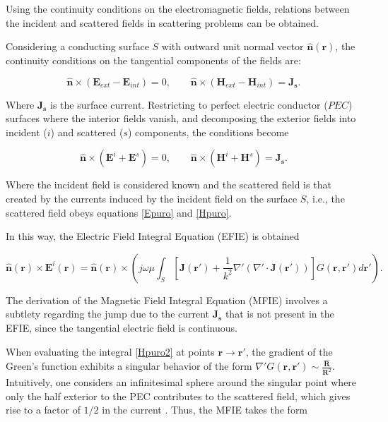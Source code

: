 \documentclass[11pt,a4paper,twoside,pdf]{article}
\numberwithin{equation}{section}
\begin{document}
Using the continuity conditions on the electromagnetic fields, relations between the incident and scattered fields in scattering problems can be obtained.

Considering a conducting surface $S$ with outward unit normal vector $\mathbf{\hat{n}}(\mathbf{r})$, the continuity conditions on the tangential components of the fields are:

\begin{equation}
    \mathbf{\hat{n}} \times (\mathbf{E}_{ext} - \mathbf{E}_{int}) = 0, \qquad \mathbf{\hat{n}} \times (\mathbf{H}_{ext} - \mathbf{H}_{int}) = \mathbf{J_s}.
\end{equation}

Where $\mathbf{J_s}$ is the surface current. Restricting to perfect electric conductor ($PEC$) surfaces where the interior fields vanish, and decomposing the exterior fields into incident ($i$) and scattered ($s$) components, the conditions become \cite{martin2021campo}

\begin{equation}
    \mathbf{\hat{n}} \times (\mathbf{E}^{i} + \mathbf{E}^{s}) = 0, \qquad \mathbf{\hat{n}} \times (\mathbf{H}^{i} + \mathbf{H}^{s}) = \mathbf{J_s}.
\end{equation}


Where the incident field is considered known and the scattered field is that created by the currents induced by the incident field on the surface $S$, i.e., the scattered field obeys equations \ref{Epuro} and \ref{Hpuro}.

In this way, the Electric Field Integral Equation (EFIE) is obtained



\begin{equation}
\mathbf{\hat{n}(\mathbf{r})} \times \mathbf{E}^i(\mathbf{r}) = \mathbf{\hat{n} (\mathbf{r})} \times \left( j\omega\mu \int_S \left[ \mathbf{J}(\mathbf{r}') + \frac{1}{k^2} \nabla' (\nabla' \cdot \mathbf{J}(\mathbf{r}')) \right] G(\mathbf{r}, \mathbf{r}') d\mathbf{r'} \right).
\label{EFIE}
\end{equation}


The derivation of the Magnetic Field Integral Equation (MFIE) involves a subtlety regarding the jump due to the current $\bm{J_s}$ that is not present in the EFIE, since the tangential electric field is continuous.

When evaluating the integral \ref{Hpuro2} at points $\bm{r} \to \bm{r'}$, the gradient of the Green's function exhibits a singular behavior of the form $\nabla'G(\mathbf{r}, \mathbf{r}') \sim \frac{\bm{\hat{R}}}{\bm{R}^2}$. Intuitively, one considers an infinitesimal sphere around the singular point where only the half exterior to the PEC contributes to the scattered field, which gives rise to a factor of $1/2$ in the current \cite{gibson2021method}. Thus, the MFIE takes the form
\end{document}
